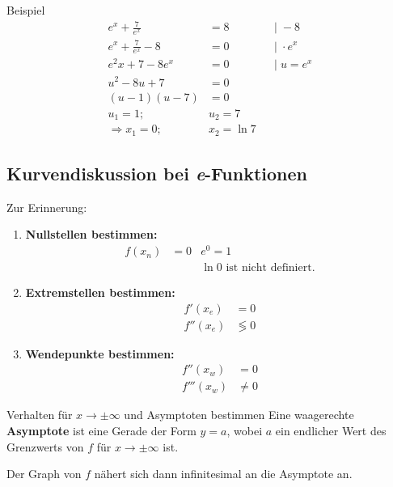 \documentclass{article}
\begin{document}
\begin{boxx}[DarkBlue]{Beispiel}
    \begin{align*}
        e^x + \frac{7}{e^x} &= 8 & &|\; -8 \\
        e^x + \frac{7}{e^x} -8 &= 0 & &|\; \cdot e^x \\
        e^2x + 7 - 8e^x &= 0 & &|\; u = e^x \\
        u^2 - 8u + 7 &= 0 \\
        (u-1)(u-7) &= 0 \\
        u_1 = 1;\;&u_2 = 7 \\
        \Rightarrow x_1 = 0;\;&x_2 = \ln 7
    \end{align*}
\end{boxx}

\newpage

\subsection{Kurvendiskussion bei \emph{e}-Funktionen}
Zur Erinnerung:
\begin{enumerate}
    \item \textbf{Nullstellen bestimmen:}
    \begin{align*}
        f(x_n) &= 0 & e^0 =1 \\
        & & \ln 0 \text{ ist nicht definiert.} 
    \end{align*}
    \item \textbf{Extremstellen bestimmen:} 
    \begin{align*}
        f'(x_e) &= 0\\
        f''(x_e) &\lessgtr 0
    \end{align*}
    \item \textbf{Wendepunkte bestimmen:}
    \begin{align*}
        f''(x_w) &= 0\\
        f'''(x_w) &\not= 0
    \end{align*}
\end{enumerate}

\begin{boxx}[Red]{Verhalten für $x \to \pm \infty$ und Asymptoten bestimmen}
    Eine waagerechte \textbf{Asymptote} ist eine Gerade der Form $y=a$,
    wobei $a$ ein endlicher Wert des Grenzwerts von $f$ für $x \to \pm \infty$ ist.
    
    Der Graph von $f$ nähert sich dann infinitesimal an die Asymptote an.
\end{boxx}
\end{document}
